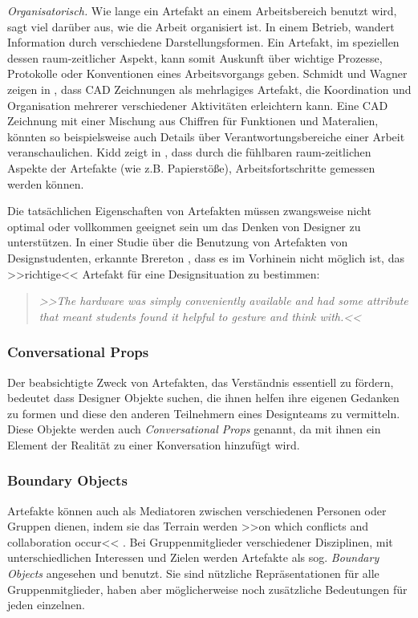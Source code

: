 \medskip \emph{Organisatorisch.} Wie lange ein Artefakt an einem Arbeitsbereich benutzt wird, sagt viel darüber aus, wie die Arbeit organisiert ist. In einem Betrieb, wandert Information durch verschiedene Darstellungsformen. Ein Artefakt, im speziellen dessen raum-zeitlicher Aspekt, kann somit Auskunft über wichtige Prozesse, Protokolle oder Konventionen eines Arbeitsvorgangs geben. Schmidt und Wagner zeigen in \citep{Schmidt:2002}, dass \ac{CAD} Zeichnungen als mehrlagiges Artefakt, die Koordination und Organisation mehrerer verschiedener Aktivitäten erleichtern kann. Eine \ac{CAD} Zeichnung mit einer Mischung aus Chiffren für Funktionen und Materalien, könnten so beispielsweise auch Details über Verantwortungsbereiche einer Arbeit veranschaulichen. Kidd zeigt in \citep{Kidd:1994}, dass durch die fühlbaren raum-zeitlichen Aspekte der Artefakte (wie z.B. Papierstöße), Arbeitsfortschritte gemessen werden können. \citep{Vyas:2008}

\bigskip Die tatsächlichen Eigenschaften von Artefakten müssen zwangsweise nicht optimal oder vollkommen geeignet sein um das Denken von Designer zu unterstützen. In einer Studie über die Benutzung von Artefakten von Designstudenten, erkannte Brereton \citep{Brereton:2000}, dass es im Vorhinein nicht möglich ist, das >>richtige<< Artefakt für eine Designsituation zu bestimmen:

\begin{quote}
	\textsl{>>The hardware was simply conveniently available and had some attribute that meant students found it helpful to gesture and think with.<<}
\begin{flushright}\citep{Brereton:2000}\end{flushright}
\end{quote}

\subsubsection{Conversational Props} 
Der beabsichtigte Zweck von Artefakten, das Verständnis essentiell zu fördern, bedeutet dass Designer Objekte suchen, die ihnen helfen ihre eigenen Gedanken zu formen und diese den anderen Teilnehmern eines Designteams zu vermitteln. Diese Objekte werden auch \emph{Conversational Props} \citep{Brinck:1992} genannt, da mit ihnen ein Element der Realität zu einer Konversation hinzufügt wird. \citep{Larsson:2003}

\subsubsection{Boundary Objects} 
Artefakte können auch als Mediatoren zwischen verschiedenen Personen oder Gruppen dienen, indem sie das Terrain werden >>on which conflicts and collaboration occur<< \citep{Perry:1998}. Bei Gruppenmitglieder verschiedener Disziplinen, mit unterschiedlichen Interessen und Zielen werden Artefakte als sog. \emph{Boundary Objects} \citep{Star:1989} angesehen und benutzt. Sie sind nützliche Repräsentationen für alle Gruppenmitglieder, haben aber möglicherweise noch zusätzliche Bedeutungen für jeden einzelnen. \citep{Larsson:2003}

